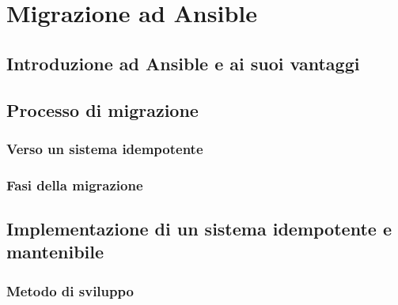 \chapter{Migrazione ad Ansible}
\label{cha:migrazione}

\section{Introduzione ad Ansible e ai suoi vantaggi}
\label{sec:ansible}

\lipsum[1]

\section{Processo di migrazione}
\label{sec:processo_migrazione}

\lipsum[1]

\subsection{Verso un sistema idempotente}
\label{sub:prerequisiti_migrazione}

\lipsum[1]

\subsection{Fasi della migrazione}
\label{sub:fasi_migrazione}

\lipsum[1]

\section{Implementazione di un sistema idempotente e mantenibile}
\label{sec:idempotenza}

\lipsum[1]

\subsection{Metodo di sviluppo}
\label{sub:sviluppo}

\lipsum[1]